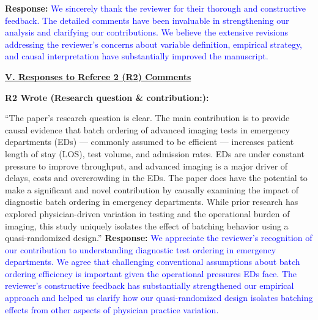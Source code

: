\documentclass[11pt]{article}
\newenvironment{quote2}
{ \bigskip
\noindent
         \small\em
         \baselineskip=14pt
}
\newcommand{\1}{\hbox{\rm 1\kern-.35em 1}}
\begin{document}
\noindent\textbf{Response:} \textcolor{blue}{We sincerely thank the reviewer for their thorough and constructive feedback. The detailed comments have been invaluable in strengthening our analysis and clarifying our contributions. We believe the extensive revisions addressing the reviewer's concerns about variable definition, empirical strategy, and causal interpretation have substantially improved the manuscript.}



\clearpage


\pagestyle{fancy}
\fancyhead{}
\renewcommand{\headrulewidth}{0pt}

\noindent\underline{\textbf{V. Responses to Referee 2 (R2) Comments}}



\begin{quote2}
\textbf{R2 Wrote (Research question \& contribution:):}  

\noindent``The paper’s research question is clear. The main contribution is to provide causal evidence that batch ordering of advanced imaging tests in emergency departments (EDs) — commonly assumed to be efficient — increases patient length of stay (LOS), test volume, and admission rates. EDs are under constant pressure to improve throughput, and advanced imaging is a major driver of delays, costs and overcrowding in the EDs. The paper does have the potential to make a significant and novel contribution by causally examining the impact of diagnostic batch ordering in emergency departments. While prior research has explored physician-driven variation in testing and the operational burden of imaging, this study uniquely isolates the effect of batching behavior using a quasi-randomized design.''
\end{quote2}

\noindent\textbf{Response:} \textcolor{blue}{We appreciate the reviewer's recognition of our contribution to understanding diagnostic test ordering in emergency departments. We agree that challenging conventional assumptions about batch ordering efficiency is important given the operational pressures EDs face. The reviewer's constructive feedback has substantially strengthened our empirical approach and helped us clarify how our quasi-randomized design isolates batching effects from other aspects of physician practice variation.}
\end{document}
